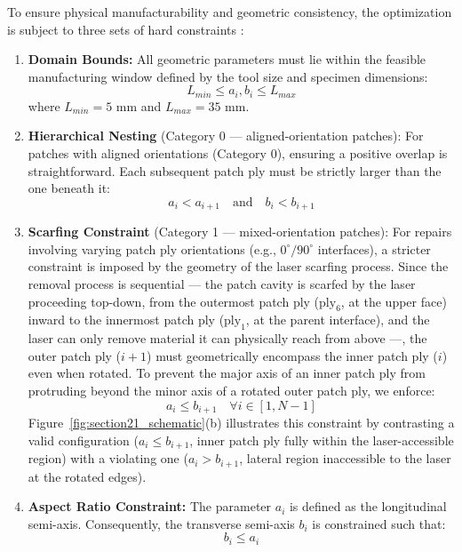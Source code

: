 \documentclass[
  preprint,
  12pt,
  a4paper
]{elsarticle}
\newcommand{\new}[1]{#1}
\begin{document}
To ensure physical manufacturability and geometric consistency, the optimization is subject to three sets of hard constraints \cite{psarras2024design}:

\begin{enumerate}
    \item \textbf{Domain Bounds:} All geometric parameters must lie within the feasible manufacturing window defined by the tool size and specimen dimensions:
    \begin{equation}
        L_{min} \leq a_i, b_i \leq L_{max}
    \end{equation}
    where $L_{min}=5$ mm and $L_{max}=35$ mm.

    \item \textbf{Hierarchical Nesting} (Category 0 \new{--- aligned-orientation patches}): For patches with aligned orientations (Category 0), ensuring a positive overlap is straightforward. Each subsequent \new{patch ply} must be strictly larger than the one beneath it:
    \begin{equation}
        a_i < a_{i+1} \quad \text{and} \quad b_i < b_{i+1}
    \end{equation}

    \item \textbf{\new{Scarfing Constraint}} (Category 1 \new{--- mixed-orientation patches}): For repairs involving varying \new{patch ply} orientations (e.g., $0^\circ/90^\circ$ interfaces), a stricter constraint is imposed \new{by the geometry of the laser scarfing process}. Since the removal process is sequential \new{--- the patch cavity is scarfed by the laser proceeding top-down, from the outermost patch ply ($\text{ply}_6$, at the upper face) inward to the innermost patch ply ($\text{ply}_1$, at the parent interface), and the laser can only remove material it can physically reach from above} ---, the outer \new{patch ply} ($i+1$) must geometrically encompass the inner \new{patch ply} ($i$) even when rotated. To prevent the major axis of an inner \new{patch ply} from protruding beyond the minor axis of a rotated outer \new{patch ply}, we enforce:
    \begin{equation}
        a_i \leq b_{i+1} \quad \forall i \in [1, N-1]
    \end{equation}
    \new{Figure~\ref{fig:section21_schematic}(b) illustrates this constraint by contrasting a valid configuration ($a_i \leq b_{i+1}$, inner patch ply fully within the laser-accessible region) with a violating one ($a_i > b_{i+1}$, lateral region inaccessible to the laser at the rotated edges).}

    \item \textbf{Aspect Ratio Constraint:} The parameter $a_i$ is defined as the longitudinal semi-axis. Consequently, the transverse semi-axis $b_i$ is constrained such that:
    \begin{equation}
        b_i \leq a_i
    \end{equation}
\end{enumerate}
\end{document}
